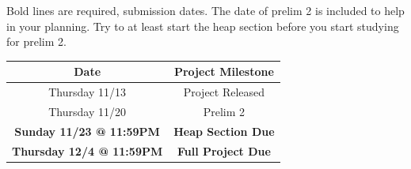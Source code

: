 \documentclass[11pt]{article}
\begin{document}
Bold lines are required, submission dates. The date of prelim 2 is included to
help in your planning. Try to at least start the heap section before you start
studying for prelim 2.\\

\begin{center}
\begin{Large}
\begin{tabular}{| c | c |}
\hline
Date & Project Milestone\\
\hline
Thursday 11/13 & Project Released\\
Thursday 11/20 & Prelim 2\\
\textbf{Sunday 11/23 @ 11:59PM} & \textbf{Heap Section Due}\\
\textbf{Thursday 12/4 @ 11:59PM} & \textbf{Full Project Due}\\
\hline
\end{tabular}
\end{Large}
\end{center}
\end{document}
